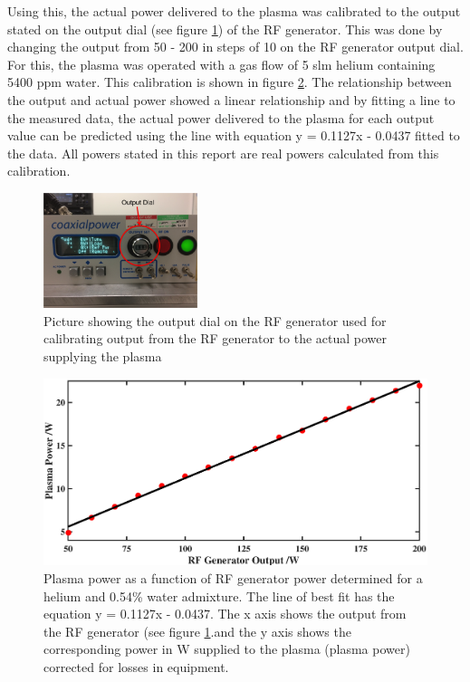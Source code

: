\documentclass[11pt, oneside]{article}   	%
\begin{document}

Using this, the actual power delivered to the plasma was calibrated to the output stated on the output dial (see figure \ref{fig:OutputDial}) of the RF generator. 
This was done by changing the output from 50 - 200 in steps of 10 on the RF generator output dial.
For this, the plasma was operated with a gas flow of 5 slm helium containing 5400 ppm water.
This calibration is shown in figure \ref{fig:SolaylPower}.
The relationship between the output and actual power showed a linear relationship and by fitting a line to the measured data, the actual power delivered to the plasma for each output value can be predicted using the line with equation y = 0.1127x - 0.0437 fitted to the data.
All powers stated in this report are real powers calculated from this calibration.

\begin{figure}
    \centering
    \includegraphics[width=0.4\textwidth]{Figures/OutputDial.png}
    \caption{Picture showing the output dial on the RF generator used for calibrating output from the RF generator to the actual power supplying the plasma}
    \label{fig:OutputDial}
\end{figure}

\begin{figure}
    \centering
    \includegraphics[width=\textwidth]{Figures/ActualPowerBig.eps}
    \caption{Plasma power as a function of RF generator power determined for a helium and 0.54\% water admixture. The line of best fit has the equation y = 0.1127x - 0.0437. The x axis shows the output from the RF generator (see figure \ref{fig:OutputDial}.and the y axis shows the corresponding power in W supplied to the plasma (plasma power) corrected for losses in equipment.}
    \label{fig:SolaylPower}
\end{figure}
\end{document}
